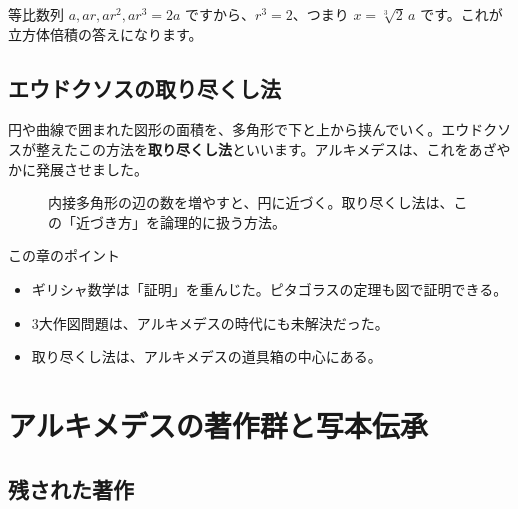 \documentclass[a4paper,11pt,openany]{ltjsbook}
\begin{document}
等比数列 $a, ar, ar^2, ar^3=2a$ ですから、$r^3=2$、つまり $x=\sqrt[3]{2}\,a$ です。これが立方体倍積の答えになります。

\section{エウドクソスの取り尽くし法}

円や曲線で囲まれた図形の面積を、多角形で下と上から挟んでいく。エウドクソスが整えたこの方法を\textbf{取り尽くし法}といいます。アルキメデスは、これをあざやかに発展させました。

\begin{figure}[htbp]
\centering
{}
\caption{内接多角形の辺の数を増やすと、円に近づく。取り尽くし法は、この「近づき方」を論理的に扱う方法。}
\end{figure}

\begin{pointbox}{この章のポイント}
\begin{itemize}[leftmargin=1.5em]
\item ギリシャ数学は「証明」を重んじた。ピタゴラスの定理も図で証明できる。
\item 3大作図問題は、アルキメデスの時代にも未解決だった。
\item 取り尽くし法は、アルキメデスの道具箱の中心にある。
\end{itemize}
\end{pointbox}

\chapter{アルキメデスの著作群と写本伝承}

\section{残された著作}
\end{document}
